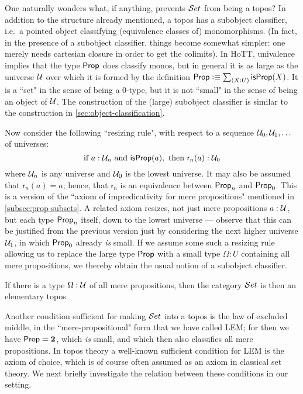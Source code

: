 One naturally wonders what, if anything, prevents $\mathcal{S}et$ from being a topos? In addition to the structure already mentioned, a topos has a
subobject classifier, i.e.\ a pointed object classifying (equivalence classes of) monomorphisms.  (In fact, in the presence of a subobject
classifier, things become somewhat simpler: one merely needs cartesian closure in order to get the colimits).  In HoTT,  univalence implies
that the type $\mathsf{Prop}$ does classify monos, but in general it is as large as the universe $\mathcal{U}$ over which it is formed by the definition
$\prop \defeq \sm{X:U}\isprop(X)$. It is a ``set" in the sense of being a $0$-type, but it is not ``small" in the sense of being an object
of $\mathcal{U}$. The construction of the (large) subobject classifier is similar to the construction in \autoref{sec:object-classification}.

Now consider the following ``resizing rule", with respect to a sequence $\mathcal{U}_0, \mathcal{U}_1, \ldots$ of universes:
\[\text{if } a:\mathcal{U}_n \text{ and\ } \mathsf{isProp}(a), \text{ then } \mathsf{r}_{n}(a): \mathcal{U}_0\]
where $\mathcal{U}_n$ is any universe and $\mathcal{U}_0$ is the lowest universe.
It may also be assumed that $\mathsf{r}_{n}(a) = a$; hence, that $\mathsf{r}_n$ is an equivalence between $\mathsf{Prop}_n$ and $\mathsf{Prop}_0$. 
This is a version of the ``axiom of impredicativity for mere propositions" mentioned in \autoref{subsec:prop-subsets}.  A related axiom resizes, not just mere propositions $a:\mathcal{U}$, but each type $\mathsf{Prop}_n$ itself, down to the lowest universe --- observe that this can be justified from the previous version just by considering the next higher universe $\mathcal{U}_1$, in which $\mathsf{Prop}_0$ already \emph{is} small.
If we assume some such a resizing rule allowing us to replace the large type $\mathsf{Prop}$ with a small type $\Omega:U$ containing all mere propositions, we thereby obtain the usual notion of a subobject classifier.
 
 \begin{thm}\label{thm:settopos} If there is a type $\Omega:\mathcal{U}$ of all mere propositions, then the category $\mathcal{S}et$ is then an elementary  topos.
 \end{thm}

Another condition sufficient for making $\mathcal{S}et$ into a topos is the law of excluded middle, in the ``mere-propositional" form that we have called LEM; for then we have $\mathsf{Prop} = \mathbf{2}$, which \emph{is} small, and which then also classifies all mere propositions.
In topos theory a well-known sufficient condition for LEM is the axiom of choice, which is of course often assumed as an axiom in classical set theory. We next briefly investigate the relation between these conditions in our setting.


